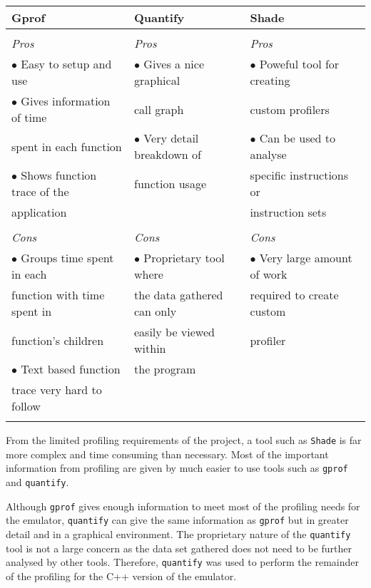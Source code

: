 \centerfigbegin
{
\begin{tabular}{|l|l|l|} \hline
Gprof				
&Quantify 	
&Shade  \\ \hline

&&\\
\emph{Pros} 		
&\emph{Pros} 	
&\emph{Pros} \\

$\bullet$ Easy to setup and use		& $\bullet$ Gives a nice graphical 	& $\bullet$  Poweful tool for creating  \\
$\bullet$ Gives information of time     & call graph   				& custom profilers \\
	  spent in each function	& $\bullet$ Very detail breakdown of 	& $\bullet$ Can be used to analyse \\
$\bullet$ Shows function trace of the   &function usage				& specific instructions or \\ 
	  application			& 					& instruction sets \\
	  
&&\\
\emph{Cons}				& \emph{Cons}			& \emph{Cons} \\

$\bullet$ Groups time spent in each  	& $\bullet$ Proprietary tool where & $\bullet$ Very large amount of work\\  
function with time spent in	 	& the data gathered can only 	& required to create custom \\
function's children			& easily be viewed within	& profiler\\
$\bullet$ Text based function 		& the program			&\\
trace very hard to follow		&				&\\
&&\\

\hline \end{tabular} } 

From the limited profiling requirements of the project, a tool such as 
\verb!Shade! is far more complex and time consuming than necessary. 
Most of the important information from profiling are given by much easier 
to use tools such as \verb!gprof! and \verb!quantify!.

Although \verb!gprof! gives enough information to meet most of the profiling 
needs for the emulator, \verb!quantify! can give the same information as
\verb!gprof! but in greater detail and in a graphical environment. The 
proprietary nature of the \verb!quantify! tool is not a large concern as 
the data set gathered does not need to be further analysed by other tools. 
Therefore, \verb!quantify! was used to perform the remainder of the 
profiling for the C++ version of the emulator.


